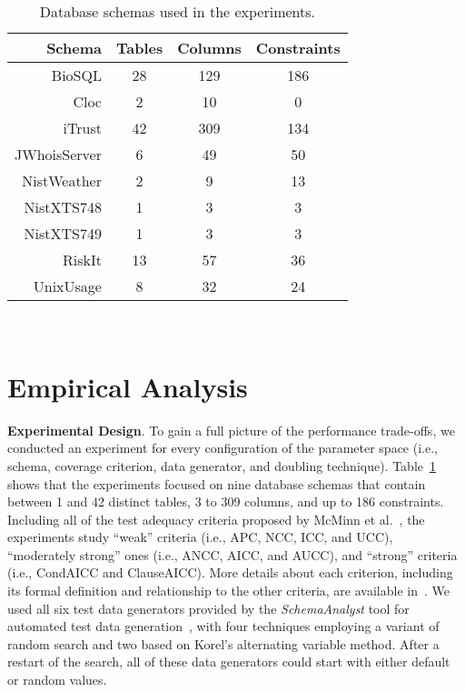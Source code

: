 
\begin{table}[t]
  \centering

  {\footnotesize
  \begin{tabular}{r | c c c}
                           Schema & Tables & Columns & Constraints \\ \hline
    BioSQL                        & 28     & 129     & 186 \\
    Cloc                          & 2      & 10      & 0 \\
    iTrust                        & 42     & 309     & 134 \\
    JWhoisServer                  & 6      & 49      & 50 \\
    NistWeather                   & 2      & 9       & 13 \\
    NistXTS748                    & 1      & 3       & 3 \\
    NistXTS749                    & 1      & 3       & 3 \\
    RiskIt                        & 13     & 57      & 36 \\
    UnixUsage                     & 8      & 32      & 24
\end{tabular}}

  \vspace*{-.05in}
  \caption{Database schemas used in the experiments.}~\label{tab:schemas}
  \vspace*{-.25in}

\end{table}

\vspace{-.05in}
\section{Empirical Analysis}
\vspace{-.05in}

\textbf{Experimental Design}. To gain a full picture of the performance trade-offs, we conducted an experiment for every
configuration of the parameter space (i.e., schema, coverage criterion, data generator, and doubling technique).
Table~\ref{tab:schemas} shows that the experiments focused on nine
database schemas that contain between 1 and 42 distinct
tables, 3 to 309 columns, and up to 186 constraints. Including all of the test adequacy criteria proposed by McMinn et
al.~\cite{mcminn2015}, the experiments study ``weak'' criteria (i.e., APC, NCC, ICC, and UCC), ``moderately strong''
ones (i.e., ANCC, AICC, and AUCC), and ``strong'' criteria (i.e., CondAICC and ClauseAICC). More details about each
criterion, including its formal definition and relationship to the other criteria, are available in~\cite{mcminn2015}. We
used all six test data generators provided by the {\em SchemaAnalyst} tool for automated test data
generation~\cite{kapfhammer2013}, with four techniques employing a variant of random search and two based on Korel's
alternating variable method. After a restart of the search, all of these data generators could
start with either default or random values.

